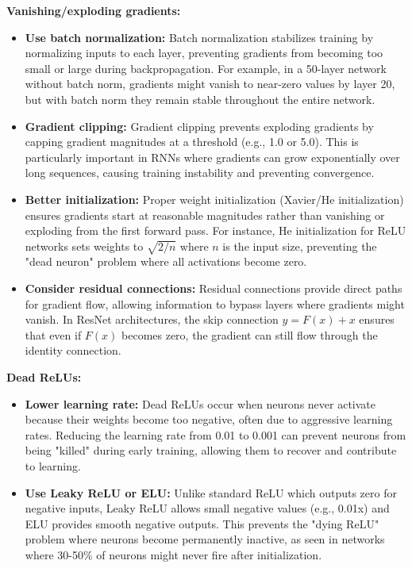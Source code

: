 \textbf{Vanishing/exploding gradients:}
\begin{itemize}
    \item \textbf{Use batch normalization:} Batch normalization stabilizes training by normalizing inputs to each layer, preventing gradients from becoming too small or large during backpropagation. For example, in a 50-layer network without batch norm, gradients might vanish to near-zero values by layer 20, but with batch norm they remain stable throughout the entire network.
    
    \item \textbf{Gradient clipping:} Gradient clipping prevents exploding gradients by capping gradient magnitudes at a threshold (e.g., 1.0 or 5.0). This is particularly important in RNNs where gradients can grow exponentially over long sequences, causing training instability and preventing convergence.
    
    \item \textbf{Better initialization:} Proper weight initialization (Xavier/He initialization) ensures gradients start at reasonable magnitudes rather than vanishing or exploding from the first forward pass. For instance, He initialization for ReLU networks sets weights to $\sqrt{2/n}$ where $n$ is the input size, preventing the "dead neuron" problem where all activations become zero.
    
    \item \textbf{Consider residual connections:} Residual connections provide direct paths for gradient flow, allowing information to bypass layers where gradients might vanish. In ResNet architectures, the skip connection $y = F(x) + x$ ensures that even if $F(x)$ becomes zero, the gradient can still flow through the identity connection.
\end{itemize}


\textbf{Dead ReLUs:}
\begin{itemize}
    \item \textbf{Lower learning rate:} Dead ReLUs occur when neurons never activate because their weights become too negative, often due to aggressive learning rates. Reducing the learning rate from 0.01 to 0.001 can prevent neurons from being "killed" during early training, allowing them to recover and contribute to learning.
    
    \item \textbf{Use Leaky ReLU or ELU:} Unlike standard ReLU which outputs zero for negative inputs, Leaky ReLU allows small negative values (e.g., 0.01x) and ELU provides smooth negative outputs. This prevents the "dying ReLU" problem where neurons become permanently inactive, as seen in networks where 30-50\% of neurons might never fire after initialization.
\end{itemize}

